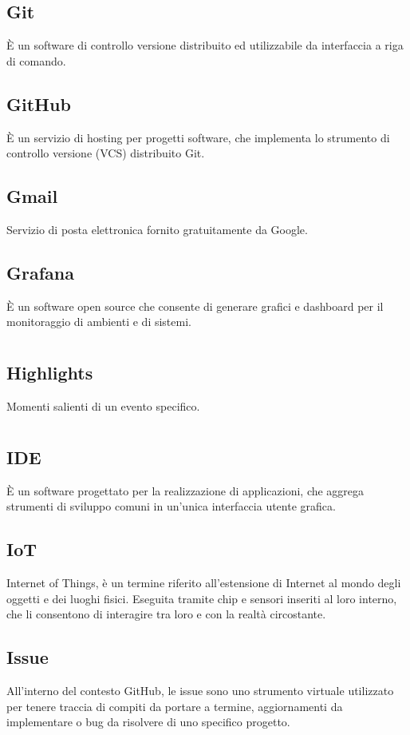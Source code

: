 	\subsection*{Git}
	È un software di controllo versione distribuito ed utilizzabile da interfaccia a riga di comando.
	\subsection*{GitHub}
	È un servizio di hosting per progetti software, che implementa lo strumento di controllo versione (VCS) distribuito Git.
	\subsection*{Gmail}
	Servizio di posta elettronica fornito gratuitamente da Google.
	\subsection*{Grafana}
	È un software open source che consente di generare grafici e dashboard per il monitoraggio di ambienti e di sistemi.
\pagebreak
\section[H]{}
	\subsection*{Highlights}
	Momenti salienti di un evento specifico. 
\pagebreak
\section[I]{}
	\subsection*{IDE}
	È un software progettato per la realizzazione di applicazioni, che aggrega strumenti di sviluppo comuni in un’unica interfaccia utente grafica.
	\subsection*{IoT}
	Internet of Things, è un termine riferito all’estensione di Internet al mondo degli oggetti e dei luoghi fisici. Eseguita tramite chip e sensori inseriti al loro interno, che li consentono di interagire tra loro e con la realtà circostante.
	\subsection*{Issue}
	All'interno del contesto GitHub, le issue sono uno strumento virtuale utilizzato per tenere traccia di compiti da portare a termine, aggiornamenti da implementare o bug da risolvere di uno specifico progetto.
\pagebreak

